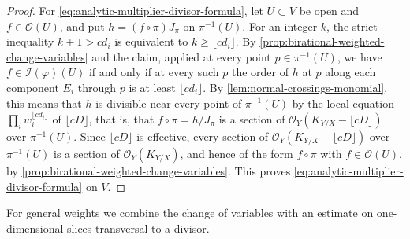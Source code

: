 \begin{proof}
For \eqref{eq:analytic-multiplier-divisor-formula}, let $U\subset V$ be open and $f\in\mathcal O(U)$, and put $h=(f\circ\pi)J_\pi$ on $\pi^{-1}(U)$. For an integer $k$, the strict inequality $k+1>cd_i$ is equivalent to $k\geq\lfloor cd_i\rfloor$. By \cref{prop:birational-weighted-change-variables} and the claim, applied at every point $p\in\pi^{-1}(U)$, we have $f\in\mathcal I(\varphi)(U)$ if and only if at every such $p$ the order of $h$ at $p$ along each component $E_i$ through $p$ is at least $\lfloor cd_i\rfloor$. By \cref{lem:normal-crossings-monomial}, this means that $h$ is divisible near every point of $\pi^{-1}(U)$ by the local equation $\prod_iw_i^{\lfloor cd_i\rfloor}$ of $\lfloor cD\rfloor$, that is, that $f\circ\pi=h/J_\pi$ is a section of $\mathcal O_Y(K_{Y/X}-\lfloor cD\rfloor)$ over $\pi^{-1}(U)$. Since $\lfloor cD\rfloor$ is effective, every section of $\mathcal O_Y(K_{Y/X}-\lfloor cD\rfloor)$ over $\pi^{-1}(U)$ is a section of $\mathcal O_Y(K_{Y/X})$, and hence of the form $f\circ\pi$ with $f\in\mathcal O(U)$, by \cref{prop:birational-weighted-change-variables}. This proves \eqref{eq:analytic-multiplier-divisor-formula} on $V$.
\end{proof}

For general weights we combine the change of variables with an estimate on one-dimensional slices transversal to a divisor.

